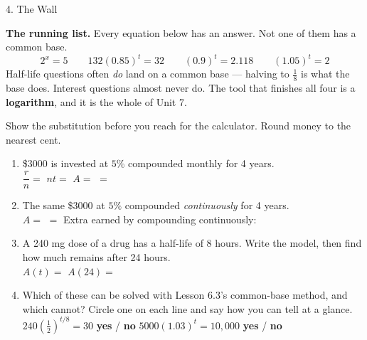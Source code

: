 \documentclass[10pt]{article}
\begin{document}
\begin{notesbox}{4. The Wall}
\vspace{3pt}
\begin{tcolorbox}[colback=redbg, colframe=redacc, boxrule=0.8pt, arc=1.5mm,
    left=2.5mm, right=2.5mm, top=1.5mm, bottom=1.5mm]
\textbf{The running list.} Every equation below has an answer. Not one of them has a common base.
\[
  2^{x}=5 \qquad 132(0.85)^{t}=32 \qquad (0.9)^{t}=2.118 \qquad (1.05)^{t}=2
\]
Half-life questions often \emph{do} land on a common base --- halving to $\frac18$ is what the base
does. Interest questions almost never do. The tool that finishes all four is a \textbf{logarithm}, and
it is the whole of Unit 7.
\end{tcolorbox}
\end{notesbox}

\begin{practicebox}
Show the substitution before you reach for the calculator. Round money to the nearest cent.
\begin{enumerate}[leftmargin=1.7em, itemsep=5pt]
  \item \$3000 is invested at $5\%$ compounded monthly for 4 years. \\[2pt]
        $\dfrac{r}{n}=$  \quad $nt=$  \quad
        $A=$  $=$ 

  \item The same \$3000 at $5\%$ compounded \emph{continuously} for 4 years. \\[2pt]
        $A=$  $=$  \quad Extra earned by compounding continuously:

  \item A 240 mg dose of a drug has a half-life of 8 hours. Write the model, then find how much
        remains after 24 hours. \\[2pt]
        $A(t)=$  \hfill $A(24)=$ 

  \item Which of these can be solved with Lesson 6.3's common-base method, and which cannot? Circle
        one on each line and say how you can tell at a glance.
        \\[2pt]
        \hspace*{1.0em} $240\left(\frac12\right)^{t/8}=30$ \quad \textcolor{keyred}{\textbf{yes}} / \textbf{no}
        \hfill
        $5000(1.03)^{t}=10{,}000$ \quad \textbf{yes} / \textcolor{keyred}{\textbf{no}}
        \\[2pt]
\end{enumerate}
\end{practicebox}
\end{document}
